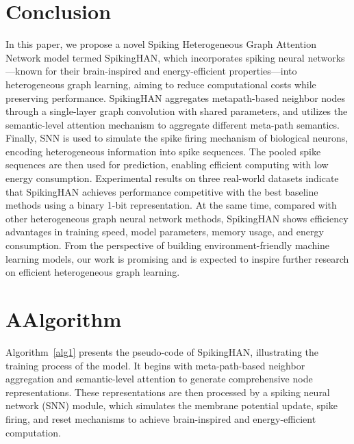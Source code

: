 \documentclass[letterpaper]{article} %
\begin{document}
\section{Conclusion}
In this paper, we propose a novel Spiking Heterogeneous Graph Attention Network model termed SpikingHAN, which incorporates spiking neural networks—known for their brain-inspired and energy-efficient properties—into heterogeneous graph learning, aiming to reduce computational costs while preserving performance. SpikingHAN aggregates metapath-based neighbor nodes through a single-layer graph convolution with shared parameters, and utilizes the semantic-level attention mechanism to aggregate different meta-path semantics. Finally, SNN is used to simulate the spike firing mechanism of biological neurons, encoding heterogeneous information into spike sequences. The pooled spike sequences are then used for prediction, enabling efficient computing with low energy consumption. Experimental results on three real-world datasets indicate that SpikingHAN achieves performance competitive with the best baseline methods using a binary 1-bit representation. At the same time, compared with other heterogeneous graph neural network methods, SpikingHAN shows efficiency advantages in training speed, model parameters, memory usage, and energy consumption. From the perspective of building environment-friendly machine learning models, our work is promising and is expected to inspire further research on efficient heterogeneous graph learning.

\newpage
\appendix
\section{A\hspace{1em}Algorithm}
 Algorithm~\ref{alg1} presents the pseudo-code of SpikingHAN, illustrating the training process of the model. It begins with meta-path-based neighbor aggregation and semantic-level attention to generate comprehensive node representations. These representations are then processed by a spiking neural network (SNN) module, which simulates the membrane potential update, spike firing, and reset mechanisms to achieve brain-inspired and energy-efficient computation.
 
\end{document}
